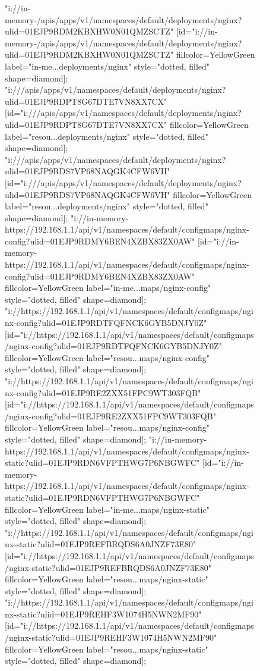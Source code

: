 \begin{figure}[p]
\begin{sideways}
{"i://in-memory-/apis/apps/v1/namespaces/default/deployments/nginx?ulid=01EJP9RDM2KBXHW0N01QMZSCTZ" [id="i://in-memory-/apis/apps/v1/namespaces/default/deployments/nginx?ulid=01EJP9RDM2KBXHW0N01QMZSCTZ" fillcolor=YellowGreen label="in-me...deployments/nginx" style="dotted, filled" shape=diamond];
"i:///apis/apps/v1/namespaces/default/deployments/nginx?ulid=01EJP9RDPT8G67DTE7VN8XX7CX" [id="i:///apis/apps/v1/namespaces/default/deployments/nginx?ulid=01EJP9RDPT8G67DTE7VN8XX7CX" fillcolor=YellowGreen label="resou...deployments/nginx" style="dotted, filled" shape=diamond];
"i:///apis/apps/v1/namespaces/default/deployments/nginx?ulid=01EJP9RDS7VP68NAQGK4CFW6VH" [id="i:///apis/apps/v1/namespaces/default/deployments/nginx?ulid=01EJP9RDS7VP68NAQGK4CFW6VH" fillcolor=YellowGreen label="resou...deployments/nginx" style="dotted, filled" shape=diamond];
"i://in-memory-https://192.168.1.1/api/v1/namespaces/default/configmaps/nginx-config?ulid=01EJP9RDMY6BEN4XZBX83ZX0AW" [id="i://in-memory-https://192.168.1.1/api/v1/namespaces/default/configmaps/nginx-config?ulid=01EJP9RDMY6BEN4XZBX83ZX0AW" fillcolor=YellowGreen label="in-me...maps/nginx-config" style="dotted, filled" shape=diamond];
"i://https://192.168.1.1/api/v1/namespaces/default/configmaps/nginx-config?ulid=01EJP9RDTFQFNCK6GYB5DNJY0Z" [id="i://https://192.168.1.1/api/v1/namespaces/default/configmaps/nginx-config?ulid=01EJP9RDTFQFNCK6GYB5DNJY0Z" fillcolor=YellowGreen label="resou...maps/nginx-config" style="dotted, filled" shape=diamond];
"i://https://192.168.1.1/api/v1/namespaces/default/configmaps/nginx-config?ulid=01EJP9RE2ZXX51FPC9WT303FQB" [id="i://https://192.168.1.1/api/v1/namespaces/default/configmaps/nginx-config?ulid=01EJP9RE2ZXX51FPC9WT303FQB" fillcolor=YellowGreen label="resou...maps/nginx-config" style="dotted, filled" shape=diamond];
"i://in-memory-https://192.168.1.1/api/v1/namespaces/default/configmaps/nginx-static?ulid=01EJP9RDN6VFPTHWG7P6NBGWFC" [id="i://in-memory-https://192.168.1.1/api/v1/namespaces/default/configmaps/nginx-static?ulid=01EJP9RDN6VFPTHWG7P6NBGWFC" fillcolor=YellowGreen label="in-me...maps/nginx-static" style="dotted, filled" shape=diamond];
"i://https://192.168.1.1/api/v1/namespaces/default/configmaps/nginx-static?ulid=01EJP9REFBRQDS6A0JNZF73E80" [id="i://https://192.168.1.1/api/v1/namespaces/default/configmaps/nginx-static?ulid=01EJP9REFBRQDS6A0JNZF73E80" fillcolor=YellowGreen label="resou...maps/nginx-static" style="dotted, filled" shape=diamond];
"i://https://192.168.1.1/api/v1/namespaces/default/configmaps/nginx-static?ulid=01EJP9REHF3W1074H5NWN2MF90" [id="i://https://192.168.1.1/api/v1/namespaces/default/configmaps/nginx-static?ulid=01EJP9REHF3W1074H5NWN2MF90" fillcolor=YellowGreen label="resou...maps/nginx-static" style="dotted, filled" shape=diamond];
}
\end{sideways}
\end{figure}
